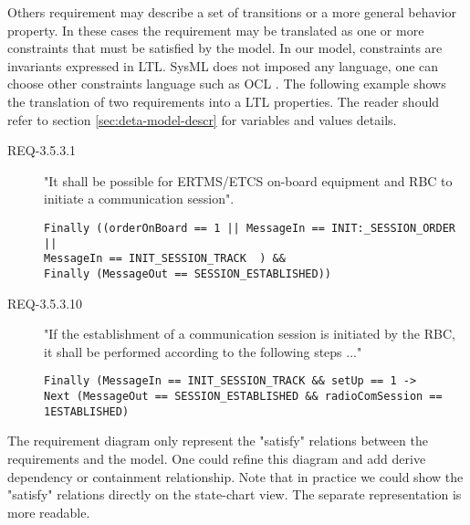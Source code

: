 Others requirement may describe a set of transitions or a more general behavior
property.
In these cases the requirement may be translated as one or more constraints that must be
satisfied by the model. In our model, constraints are invariants expressed in
LTL\cite{PnueliLTL1977}.
SysML does not imposed any language, one can choose other constraints language
such as OCL \cite{ocl2012}.
The following example shows the translation of two requirements into a LTL
properties. The reader should refer to section \ref{sec:deta-model-descr}
for variables and values details.
\begin{description}
\item[REQ-3.5.3.1] "It shall be possible for ERTMS/ETCS on-board equipment and RBC to
initiate a communication session".
\vspace{-1em}
\begin{verbatim}
Finally ((orderOnBoard == 1 || MessageIn == INIT:_SESSION_ORDER || 
MessageIn == INIT_SESSION_TRACK  ) && 
Finally (MessageOut == SESSION_ESTABLISHED))
\end{verbatim}
\end{description}
\begin{description}
\item[REQ-3.5.3.10] "If the establishment of a communication session is
initiated by the RBC, it shall be performed according to the following steps
..."
\vspace{-1em}
\begin{verbatim}
Finally (MessageIn == INIT_SESSION_TRACK && setUp == 1 -> 
Next (MessageOut == SESSION_ESTABLISHED && radioComSession == 1ESTABLISHED)
\end{verbatim}
\end{description}


The requirement diagram only represent the "satisfy" relations between the
requirements and the model. One could refine this diagram and add derive
dependency or containment relationship. Note that in practice we could show the
"satisfy" relations directly on the state-chart view. The separate representation
is more readable. 
